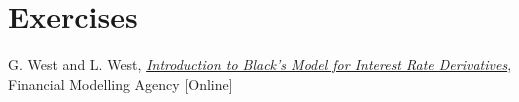 %

\section*{Exercises}


\begin{thebibliography}{9}
 G. West and L. West, \href{http://janroman.dhis.org/finance/Black/IntroToBlack.pdf}{\emph{Introduction to Black's Model for Interest Rate Derivatives}}, Financial Modelling Agency [Online]
\end{thebibliography}